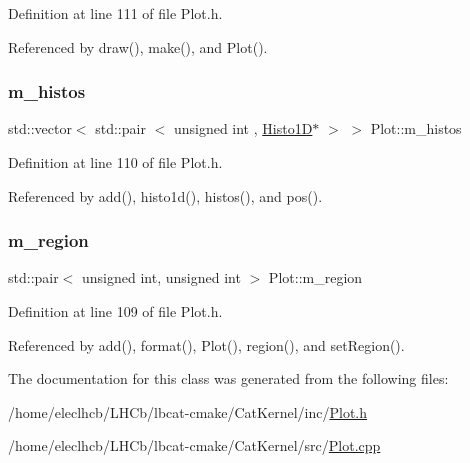 Definition at line 111 of file Plot.\+h.



Referenced by draw(), make(), and Plot().

\mbox{\label{classPlot_a7edebf2b275223b8ce55f6ef3b2da0cc}} 
\subsubsection{\texorpdfstring{m\+\_\+histos}{m\_histos}}
{\footnotesize\ttfamily std\+::vector$<$ std\+::pair $<$ unsigned int , \hyperlink{classHisto1D}{Histo1D}$\ast$ $>$ $>$ Plot\+::m\+\_\+histos\hspace{0.3cm}{\ttfamily [private]}}



Definition at line 110 of file Plot.\+h.



Referenced by add(), histo1d(), histos(), and pos().

\mbox{\label{classPlot_aabcbba1cfc66babcbcd647fdf90cdbf1}} 
\subsubsection{\texorpdfstring{m\+\_\+region}{m\_region}}
{\footnotesize\ttfamily std\+::pair$<$ unsigned int, unsigned int $>$ Plot\+::m\+\_\+region\hspace{0.3cm}{\ttfamily [private]}}



Definition at line 109 of file Plot.\+h.



Referenced by add(), format(), Plot(), region(), and set\+Region().



The documentation for this class was generated from the following files\+:\begin{DoxyCompactItemize}
\item 
/home/eleclhcb/\+L\+H\+Cb/lbcat-\/cmake/\+Cat\+Kernel/inc/\hyperlink{Plot_8h}{Plot.\+h}\item 
/home/eleclhcb/\+L\+H\+Cb/lbcat-\/cmake/\+Cat\+Kernel/src/\hyperlink{Plot_8cpp}{Plot.\+cpp}\end{DoxyCompactItemize}
